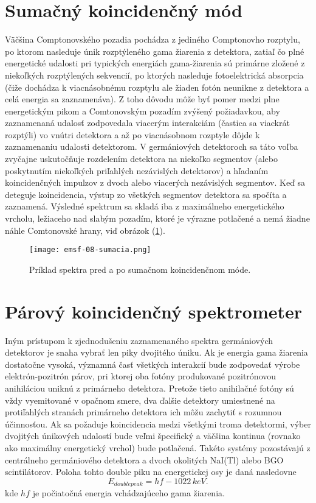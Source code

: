 \documentclass[../../main.tex]{subfiles}
\begin{document}
\section{Sumačný koincidenčný mód}
Väčšina Comptonovského pozadia pochádza z jediného Comptonovho rozptylu, po ktorom nasleduje únik rozptýleného gama žiarenia z detektora, zatiaľ čo plné energetické udalosti pri typických energiách gama-žiarenia sú primárne zložené z niekoľkých rozptýlených sekvencií, po ktorých nasleduje fotoelektrická absorpcia (čiže dochádza k viacnásobnému rozptylu ale žiaden fotón neunikne z detektora a celá energia sa zaznamenáva). Z toho dôvodu môže byť pomer medzi plne energetickým pikom a Comtonovským pozadím zvýšený požiadavkou, aby zaznamenaná udalosť zodpovedala viacerým interakciám (častica sa viackrát rozptýli) vo vnútri detektora a až po viacnásobnom rozptyle dôjde k zaznamenaniu udalosti detektorom. V germániových detektoroch sa táto voľba zvyčajne uskutočňuje rozdelením detektora na niekoľko segmentov (alebo poskytnutím niekoľkých priľahlých nezávislých detektorov) a hľadaním koincidenčných impulzov z dvoch alebo viacerých nezávislých segmentov. Keď sa deteguje koincidencia, výstup zo všetkých segmentov detektora sa spočíta a zaznamená. Výsledné spektrum sa skladá iba z maximálneho energetického vrcholu, ležiaceho nad slabým pozadím, ktoré je výrazne potlačené a nemá žiadne náhle Comtonovské hrany, viď obrázok (\ref{em8:fig:sumacia}).

\begin{figure}[!h]
\texttt{[image: emsf-08-sumacia.png]}
\centering
\caption{Príklad spektra pred a po sumačnom koincidenčnom móde.}
\label{em8:fig:sumacia}
\end{figure}

\section{Párový koincidenčný spektrometer}
Iným prístupom k zjednodušeniu zaznamenaného spektra germániových detektorov je snaha vybrať len piky dvojitého úniku. Ak je energia gama žiarenia dostatočne vysoká, významná časť všetkých interakcií bude zodpovedať výrobe elektrón-pozitrón párov, pri ktorej oba fotóny produkované pozitrónovou anihiláciou uniknú z primárneho detektora. Pretože tieto anihilačné fotóny sú vždy vyemitované v opačnom smere, dva ďalšie detektory umiestnené na protiľahlých stranách primárneho detektora ich môžu zachytiť s rozumnou účinnosťou. Ak sa požaduje koincidencia medzi všetkými troma detektormi, výber dvojitých únikových udalostí bude veľmi špecifický a väčšina kontinua (rovnako ako maximálny energetický vrchol) bude potlačená. Takéto systémy pozostávajú z centrálneho germániového detektora a dvoch okolitých NaI(Tl) alebo BGO scintilátorov. Poloha tohto double piku na energetickej osy je daná nasledovne
$$ E_{doublepeak} = hf - 1022\,keV.$$
kde $hf$ je počiatočná energia vchádzajúceho gama žiarenia.
\end{document}
